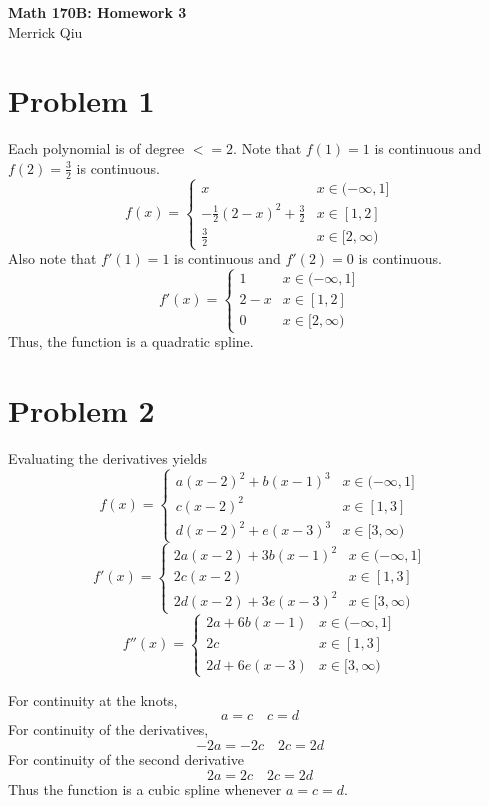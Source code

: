 \documentclass{article}
\begin{document}
\begin{center}
	\huge{\bf Math 170B: Homework 3} \\
	Merrick Qiu
\end{center}

\section*{Problem 1}
Each polynomial is of degree $<= 2$.
Note that $f(1) = 1$ is continuous and $f(2) = \frac{3}{2}$ is continuous.
\[
	f(x) = 
	\begin{cases}
		x & x \in (-\infty, 1] \\
		-\frac{1}{2}(2-x)^2 + \frac{3}{2} & x \in [1,2] \\
		\frac{3}{2} & x \in [2,\infty)
	\end{cases}
\]
Also note that $f'(1) = 1$ is continuous and $f'(2) = 0$ is continuous.
\[
	f'(x) = 
	\begin{cases}
		1 & x \in (-\infty, 1] \\
		2-x & x \in [1,2] \\
		0 & x \in [2,\infty)
	\end{cases}
\]
Thus, the function is a quadratic spline.
\newpage 

\section*{Problem 2}
Evaluating the derivatives yields
\[
	f(x) = 
	\begin{cases}
		a(x-2)^2+b(x-1)^3 & x \in (-\infty, 1] \\
		c(x-2)^2 & x \in [1,3] \\
		d(x-2)^2 + e(x-3)^3 & x \in [3,\infty)
	\end{cases}
\]
\[
	f'(x) = 
	\begin{cases}
		2a(x-2)+3b(x-1)^2 & x \in (-\infty, 1] \\
		2c(x-2) & x \in [1,3] \\
		2d(x-2) + 3e(x-3)^2 & x \in [3,\infty)
	\end{cases}
\]
\[
	f''(x) = 
	\begin{cases}
		2a+6b(x-1) & x \in (-\infty, 1] \\
		2c & x \in [1,3] \\
		2d + 6e(x-3) & x \in [3,\infty)
	\end{cases}
\]

For continuity at the knots,
\[
	a = c \quad c = d
\]
For continuity of the derivatives,
\[
	-2a = -2c \quad 2c = 2d
\]
For continuity of the second derivative 
\[
	2a = 2c \quad 2c = 2d
\]
Thus the function is a cubic spline whenever $a=c=d$.
\newpage 
\end{document}
